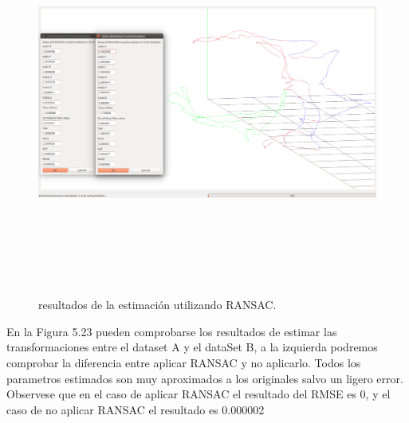 \begin{figure}
\begin{center}
\label{fig:opciones de View}\includegraphics[height=12.0cm,width=18.0cm]{img/cap6/newData_EscalaTraslaRota_aB.png}
\hspace{0.5cm}

\end{center}

\caption{ resultados de la estimación  utilizando RANSAC.}
\end{figure}

En la Figura 5.23 pueden comprobarse los resultados de estimar las transformaciones entre el dataset A y el dataSet B, a la izquierda podremos comprobar la diferencia entre aplicar RANSAC y no aplicarlo. Todos los parametros estimados son muy aproximados a los originales salvo un ligero error. Observese que en el caso de aplicar RANSAC el resultado del RMSE es 0, y el caso de no aplicar RANSAC el resultado es 0.000002


